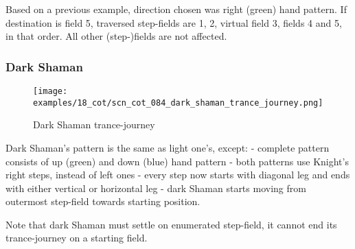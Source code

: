 Based on a previous example, direction chosen was right (green) hand pattern.
If destination is field 5, traversed step-fields are 1, 2, virtual field 3,
fields 4 and 5, in that order. All other (step-)fields are not affected.

\clearpage %

\subsubsection*{Dark Shaman}
\label{sec:Conquest of Tlalocan/Trance-journey/Movement/Dark Shaman}

\vspace*{-1.5\baselineskip}
\noindent
\begin{figure}[!h]
\texttt{[image: examples/18\_cot/scn\_cot\_084\_dark\_shaman\_trance\_journey.png]}
\vspace*{-1.4\baselineskip}
\caption{Dark Shaman trance-journey}
\label{fig:scn_cot_084_dark_shaman_trance_journey}
\end{figure}

\vspace*{-0.5\baselineskip}
Dark Shaman's pattern is the same as light one's, except: \newline
- complete pattern consists of up (green) and down (blue) hand pattern \newline
- both patterns use Knight's right steps, instead of left ones \newline
- every step now starts with diagonal leg and ends with either vertical or horizontal leg \newline
- dark Shaman starts moving from outermost step-field towards starting position.

\clearpage %

Note that dark Shaman must settle on enumerated step-field, it cannot end its
trance-journey on a starting field.


